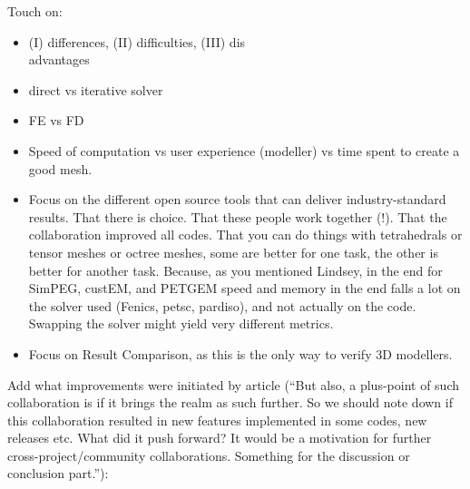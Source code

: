 \documentclass[
    paper,
  ]{geophysics}
\begin{document}
Touch on:
\begin{itemize}
  \item (I) differences, (II) difficulties, (III) dis\\advantages
  \item direct vs iterative solver
  \item FE vs FD
  \item Speed of computation vs user experience (modeller) vs time spent to
    create a good mesh.
    \item Focus on the different open source tools that can deliver industry-standard results. That there is choice. That these people work together (!). That the collaboration improved all codes. That you can do things with tetrahedrals or tensor meshes or octree meshes, some are better for one task, the other is better for another task. Because, as you mentioned Lindsey, in the end for SimPEG, custEM, and PETGEM speed and memory in the end falls a lot on the solver used (Fenics, petsc, pardiso), and not actually on the code. Swapping the solver might yield very different metrics.
    \item Focus on Result Comparison, as this is the only way to verify 3D modellers.
\end{itemize}

Add what improvements were initiated by article (“But also, a plus-point of such collaboration is if it brings the realm as such further. So we should note down if this collaboration resulted in new features implemented in some codes, new releases etc. What did it push forward? It would be a motivation for further cross-project/community collaborations. Something for the discussion or conclusion part.”):
\end{document}

